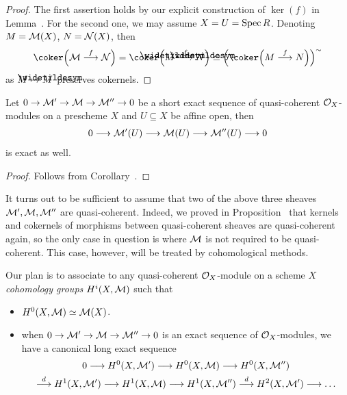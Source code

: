 \documentclass[a4paper,parskip=half,numbers=enddot, DIV=12]{scrreprt}
\begin{document}
\begin{proof}
	The first assertion holds by our explicit construction of $\ker(f)$ in Lemma~. For the second one, we may assume $X=U=\operatorname{Spec} R$. Denoting $M=\mathcal{M}(X)$, $N=\mathcal{N}(X)$, then
	\begin{align*}
		\coker\Big(\Mm\morphism[f]\Nn\Big)=\coker\Big(\snake{M}\morphism[f]\snake{N}\Big)\simeq\Big(\coker\Big(M\morphism[f]N\Big)\Big)^\sim
	\end{align*}
	as $M\mapsto\snake{M}$ preserves cokernels.
\end{proof}
\begin{cor}
	Let $0\morphism\Mm'\morphism\Mm\morphism\Mm''\morphism0$ be a short exact sequence of quasi-coherent $\mathcal{O}_X$-modules on a prescheme $X$ and $U\subseteq X$ be affine open, then 
	\begin{align*}
		0\morphism\Mm'(U)\morphism\Mm(U)\morphism\Mm''(U)\morphism 0
	\end{align*}
	is exact as well.
\end{cor}
\begin{proof}
	Follows from Corollary~.
\end{proof}
\begin{rem*}
	It turns out to be sufficient to assume that two of the above three sheaves $\mathcal{M}',\mathcal{M},\mathcal{M}''$ are quasi-coherent. Indeed, we proved in Proposition~ that kernels and cokernels of morphisms between quasi-coherent sheaves are quasi-coherent again, so the only case in question is where $\mathcal{M}$ is not required to be quasi-coherent. This case, however, will be treated by cohomological methods.
\end{rem*}
Our plan is to associate to any quasi-coherent $\mathcal{O}_X$-module on a scheme $X$ \emph{cohomology groups} $H^i(X,\mathcal{M})$ such that
\begin{itemize}
	\item $H^0(X,\mathcal{M})\simeq\mathcal{M}(X)$.
	\item when $0\morphism\Mm'\morphism\Mm\morphism\Mm''\morphism0$ is an exact sequence of $\mathcal{O}_X$-modules, we have a canonical long exact sequence
	\begin{multline*}
		0\morphism H^0(X,\Mm')\morphism H^0(X,\Mm)\morphism H^0(X,\Mm'')\\
		\morphism[d] H^1(X,\Mm')\morphism H^1(X,\Mm)\morphism H^1(X,\Mm'')\morphism[d]H^2(X,\Mm')\morphism\ldots
	\end{multline*}
\end{itemize}
\end{document}
